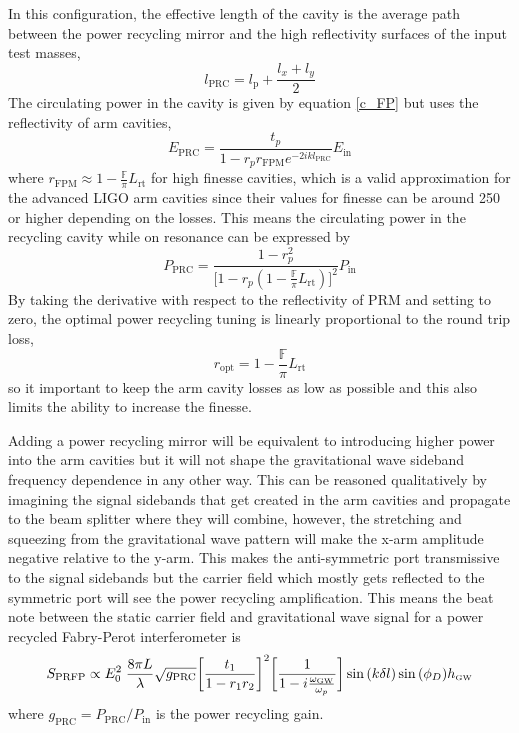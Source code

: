 		In this configuration, the effective length of the cavity is
		the average path between the power recycling mirror and the high reflectivity surfaces of the input test masses,
		\begin{equation}
		l_{\text{PRC}} = l_\text{p} + \frac{l_x + l_y}{2}
		\end{equation}
		The circulating power in the cavity is given by equation \ref{c_FP} but uses the reflectivity of arm cavities,
		\begin{equation}
		E_{\text{PRC}} = \frac{t_p}{1- r_p r_{\text{FPM}}   e^{-2ik l_{\text{PRC}}}}E_{\text{in}}
		\end{equation}
		where $r_{\text{FPM}}\approx 1 - \frac{\mathbb{F}}{\pi} L_{\text{rt}} $ for high finesse cavities, which is a valid approximation for the advanced LIGO arm cavities since their values for finesse can be around 250 or higher depending on the losses.  This means the circulating power in the recycling cavity while on resonance can be expressed by
		\begin{equation}
		P_{\text{PRC}} = \frac{1-r_p^2}{\bigg[ 1 - r_p  (1 - \frac{\mathbb{F}}{\pi} L_{\text{rt}})   \bigg]^2}P_{\text{in}}
		\end{equation} 
		By taking the derivative with respect to the reflectivity of PRM and setting to zero, the optimal power recycling tuning is linearly proportional to the round trip loss,
		\begin{equation}
		r_{\text{opt}}  = 1 - \frac{\mathbb{F}}{\pi} L_{\text{rt}}
		\end{equation}
		so it important to keep the arm cavity losses as low as possible and this also limits the ability to increase the finesse.
		
		Adding a power recycling mirror will be equivalent to introducing higher power into the arm cavities but it will not shape the gravitational wave sideband frequency dependence in any other way.  This can be reasoned qualitatively by imagining the signal sidebands that get created in the arm cavities and propagate to the beam splitter where they will combine, however, the stretching and squeezing from the gravitational wave pattern will make the x-arm amplitude negative relative to the y-arm.  This makes the anti-symmetric port transmissive to the signal sidebands but the carrier field which mostly gets reflected to the symmetric port will see the power recycling amplification.  This means the beat note between the static carrier field and gravitational wave signal for a power recycled Fabry-Perot interferometer is
		\begin{equation}
		S_{\text{PRFP}} \propto E_0^2 \; \frac{8\pi L}{\lambda} \sqrt{g_{\text{PRC}}} \bigg[\frac{t_1}{1-r_1r_2}\bigg]^2 \bigg[\frac{1}{1 - i \frac{\omega_{\text{\tiny GW}}}{\omega_p}}\bigg] \sin{(k\delta l)} \sin{(\phi_{D})} h_{\text{\tiny GW}}
		\end{equation}
		where $g_{\text{PRC}} = P_{\text{PRC}}/P_{\text{in}}$ is the power recycling gain.
		

